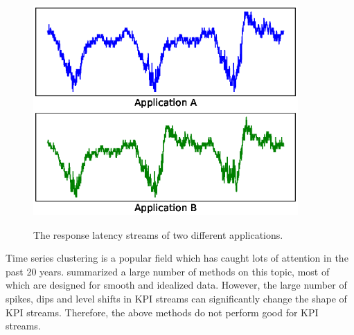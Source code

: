 \begin{figure}
\setlength{\abovecaptionskip}{-0.2cm}
      \begin{minipage}[h]{1.0\linewidth}
      \centering
      \includegraphics[width=0.9\textwidth]{fig/similar.eps}\\
      \end{minipage}
      \caption{The response latency streams of two different applications.
      }
      \label{fig:similar_curve}
     \vspace{-6 mm}
\end{figure}

Time series clustering is a popular field which has caught lots of attention in the past 20 years. 
\cite{liao2005clustering} summarized a large number of methods on this topic, most of which are designed for smooth and idealized data.
However, the large number of spikes, dips and level shifts in KPI streams can significantly 
change the shape of KPI streams. 
Therefore, the above methods do not perform good for KPI streams.

